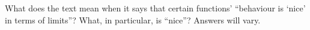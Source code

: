 {What does the text mean when it says that certain functions' ``behaviour is `nice' in terms of limits''? What, in particular, is ``nice''?}
{Answers will vary.
}
